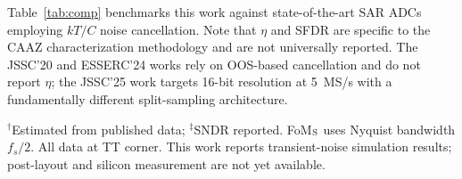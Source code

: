 \documentclass[journal]{IEEEtran}
\begin{document}
Table~\ref{tab:comp} benchmarks this work against state-of-the-art SAR ADCs employing $kT/C$ noise cancellation. Note that $\eta$ and SFDR are specific to the CAAZ characterization methodology and are not universally reported. The JSSC'20 and ESSERC'24 works rely on OOS-based cancellation and do not report $\eta$; the JSSC'25 work targets 16-bit resolution at 5~MS/s with a fundamentally different split-sampling architecture.

\begin{table}[htbp]
\centering
\caption{Performance Comparison}
\label{tab:comp}
\small
{}
\par\footnotesize{$^\dagger$Estimated from published data; $^\ddagger$SNDR reported. FoM$_{\rm S}$ uses Nyquist bandwidth $f_s/2$. All data at TT corner. This work reports transient-noise simulation results; post-layout and silicon measurement are not yet available.}
\end{table}
\end{document}
